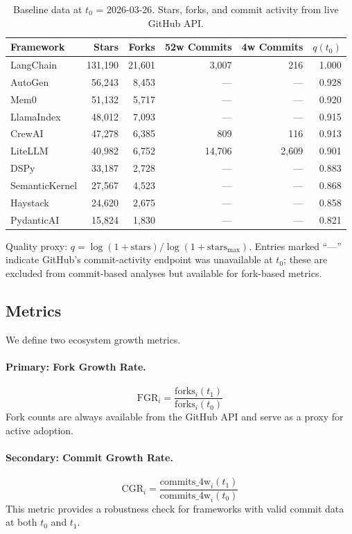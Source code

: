 \documentclass[12pt]{article}
\begin{document}
\begin{table}[h]
\centering
\caption{Baseline data at $t_0$ = 2026-03-26. Stars, forks, and commit activity from live GitHub API.}
\label{tab:baseline}
\begin{tabular}{lrrrrr}
\toprule
Framework & Stars & Forks & 52w Commits & 4w Commits & $q(t_0)$ \\
\midrule
LangChain       & 131,190 & 21,601 & 3,007  & 216   & 1.000 \\
AutoGen         &  56,243 &  8,453 &   ---  &  ---  & 0.928 \\
Mem0            &  51,132 &  5,717 &   ---  &  ---  & 0.920 \\
LlamaIndex      &  48,012 &  7,093 &   ---  &  ---  & 0.915 \\
CrewAI          &  47,278 &  6,385 &   809  & 116   & 0.913 \\
LiteLLM         &  40,982 &  6,752 & 14,706 & 2,609 & 0.901 \\
DSPy            &  33,187 &  2,728 &   ---  &  ---  & 0.883 \\
SemanticKernel  &  27,567 &  4,523 &   ---  &  ---  & 0.868 \\
Haystack        &  24,620 &  2,675 &   ---  &  ---  & 0.858 \\
PydanticAI      &  15,824 &  1,830 &   ---  &  ---  & 0.821 \\
\bottomrule
\end{tabular}

\medskip
{\footnotesize Quality proxy: $q = \log(1 + \text{stars}) / \log(1 + \text{stars}_{\max})$. Entries marked ``---'' indicate GitHub's commit-activity endpoint was unavailable at $t_0$; these are excluded from commit-based analyses but available for fork-based metrics.}
\end{table}

\subsection{Metrics}

We define two ecosystem growth metrics.

\paragraph{Primary: Fork Growth Rate.}
\[
\text{FGR}_i = \frac{\text{forks}_i(t_1)}{\text{forks}_i(t_0)}
\]
Fork counts are always available from the GitHub API and serve as a proxy for active adoption.

\paragraph{Secondary: Commit Growth Rate.}
\[
\text{CGR}_i = \frac{\text{commits\_4w}_i(t_1)}{\text{commits\_4w}_i(t_0)}
\]
This metric provides a robustness check for frameworks with valid commit data at both $t_0$ and $t_1$.
\end{document}
